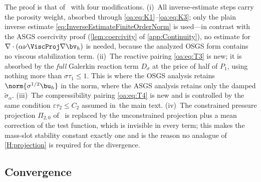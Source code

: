\begin{remark}
\label{oa:rem:proofstructure}
The proof is that of~\cite[Theorem~1]{codina2008analysis} with four modifications. (i)~All
inverse-estimate steps carry the porosity weight, absorbed through
\cref{oa:eq:K1}--\cref{oa:eq:K3}; only the plain inverse estimate
\cref{eq:InverseEstimateFiniteOrderNorm} is used---in contrast with the ASGS coercivity proof
(\cref{lem:coercivity} of \cref{app:Continuity}), no estimate for $\nabla\cdot(\alpha\nu\ViscProj\nabla\bv_h)$ is
needed, because the analyzed OSGS form contains no viscous stabilization term.
(ii)~The reactive pairing \cref{oa:eq:T3} is new; it is absorbed by the \emph{full}
Galerkin reaction term $D_\sigma$ at the price of half of $P_1$, using nothing more
than $\sigma\tau_1 \le 1$. This is where the OSGS analysis retains
$\norm{\sigma^{1/2}\bu_h}$ in the norm, where the ASGS analysis retains only the
damped $\widetilde{\sigma}_\alpha$. (iii)~The compressibility pairing \cref{oa:eq:T4} is
new and is controlled by the same condition $\varepsilon\tau_2 \le C_2$ assumed
in~the main text. (iv)~The constrained pressure projection $\Pi_{2,0}$
of~\cite{codina2008analysis} is replaced by the unconstrained projection plus a mean
correction of the test function, which is invisible in every term; this makes the
mass-slot stability constant exactly one and is the reason no analogue of
\cref{H:projection} is required for the divergence.
\end{remark}

\subsection{Convergence}
\label{oa:sec:convergence}

